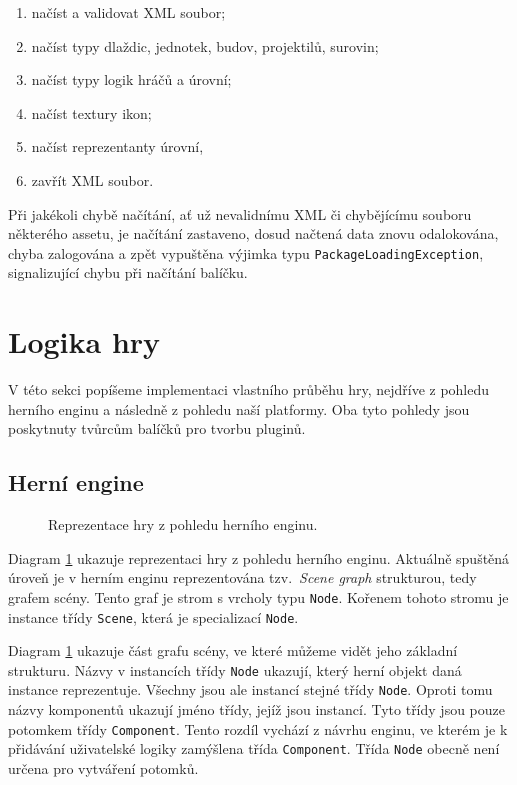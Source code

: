 \begin{enumerate}
	\item načíst a validovat XML soubor;
	\item načíst typy dlaždic, jednotek, budov, projektilů, surovin;
	\item načíst typy logik hráčů a úrovní;
	\item načíst textury ikon;
	\item načíst reprezentanty úrovní,
	\item zavřít XML soubor.
\end{enumerate}

Při jakékoli chybě načítání, ať už nevalidnímu XML či chybějícímu souboru některého assetu, je načítání zastaveno, dosud načtená data znovu odalokována, chyba zalogována a zpět vypuštěna výjimka typu \texttt{PackageLoadingException}, signalizující chybu při načítání balíčku.

\section{Logika hry}
V této sekci popíšeme implementaci vlastního průběhu hry, nejdříve z pohledu herního enginu a následně z pohledu naší platformy. Oba tyto pohledy jsou poskytnuty tvůrcům balíčků pro tvorbu pluginů.

\subsection{Herní engine}
\label{sec:engineview}

\begin{figure}[h]
	\centering
	\fontsize{8pt}{11pt}\selectfont
	\def\svgwidth{\textwidth}
	
	\caption{Reprezentace hry z pohledu herního enginu.}
	\label{fig:scenegraph}
\end{figure}


Diagram \ref{fig:scenegraph} ukazuje reprezentaci hry z pohledu herního enginu. Aktuálně spuštěná úroveň je v herním enginu reprezentována tzv.~\textit{Scene graph} strukturou, tedy grafem scény. Tento graf je strom s vrcholy typu \texttt{Node}. Kořenem tohoto stromu je instance třídy \texttt{Scene}, která je specializací \texttt{Node}.

Diagram \ref{fig:scenegraph} ukazuje část grafu scény, ve které můžeme vidět jeho základní strukturu. Názvy v instancích třídy \texttt{Node} ukazují, který herní objekt daná instance reprezentuje. Všechny jsou ale instancí stejné třídy \texttt{Node}. Oproti tomu názvy komponentů ukazují jméno třídy, jejíž jsou instancí. Tyto třídy jsou pouze potomkem třídy \texttt{Component}. Tento rozdíl vychází z návrhu enginu, ve kterém je k přidávání uživatelské logiky zamýšlena třída \texttt{Component}. Třída \texttt{Node} obecně není určena pro vytváření potomků.

